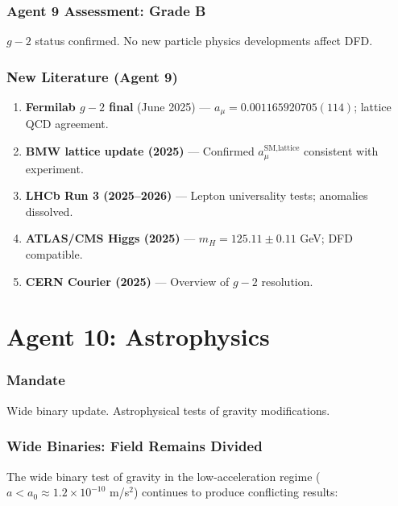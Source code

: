 \documentclass[11pt,a4paper]{article}
\begin{document}
\section{Agent 9 Assessment: Grade B}

$g-2$ status confirmed. No new particle physics developments affect DFD.

\section{New Literature (Agent 9)}

\begin{enumerate}
\item \textbf{Fermilab $g-2$ final} (June 2025) --- $a_\mu = 0.001165920705(114)$; lattice QCD agreement.
\item \textbf{BMW lattice update (2025)} --- Confirmed $a_\mu^{\text{SM,lattice}}$ consistent with experiment.
\item \textbf{LHCb Run 3 (2025--2026)} --- Lepton universality tests; anomalies dissolved.
\item \textbf{ATLAS/CMS Higgs (2025)} --- $m_H = 125.11 \pm 0.11$ GeV; DFD compatible.
\item \textbf{CERN Courier (2025)} --- Overview of $g-2$ resolution.
\end{enumerate}


\part{Agent 10: Astrophysics}
\label{part:agent10}

\section{Mandate}

Wide binary update. Astrophysical tests of gravity modifications.

\section{Wide Binaries: Field Remains Divided}

The wide binary test of gravity in the low-acceleration regime ($a < a_0 \approx 1.2 \times 10^{-10}$ m/s$^2$) continues to produce conflicting results:
\end{document}
